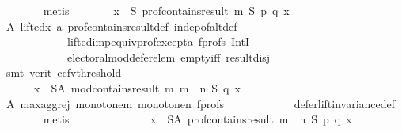 \begin{isabellebody}
\ \ \ \ \ \ \isamarkupfalse%
\ metis\isanewline
\ \ \ \ \isamarkupfalse%
\ \isamarkupfalse%
\ {\isachardoublequoteopen}{\isasymforall}x\ {\isasymin}\ S{\isachardot}{\kern0pt}\ prof{\isacharunderscore}{\kern0pt}contains{\isacharunderscore}{\kern0pt}result\ m\ S\ p\ q\ x{\isachardoublequoteclose}\isanewline
\ \ \ \ \ \ \isamarkupfalse%
\ A\ lifted{\isacharunderscore}{\kern0pt}x\ a{}\ prof{\isacharunderscore}{\kern0pt}contains{\isacharunderscore}{\kern0pt}result{\isacharunderscore}{\kern0pt}def\ indep{\isacharunderscore}{\kern0pt}of{\isacharunderscore}{\kern0pt}alt{\isacharunderscore}{\kern0pt}def\isanewline
\ \ \ \ \ \ \ \ \ \ \ \ lifted{\isacharunderscore}{\kern0pt}imp{\isacharunderscore}{\kern0pt}equiv{\isacharunderscore}{\kern0pt}prof{\isacharunderscore}{\kern0pt}except{\isacharunderscore}{\kern0pt}a\ f{\isacharunderscore}{\kern0pt}profs\ IntI\isanewline
\ \ \ \ \ \ \ \ \ \ \ \ electoral{\isacharunderscore}{\kern0pt}mod{\isacharunderscore}{\kern0pt}defer{\isacharunderscore}{\kern0pt}elem\ empty{\isacharunderscore}{\kern0pt}iff\ result{\isacharunderscore}{\kern0pt}disj\isanewline
\ \ \ \ \ \ \isamarkupfalse%
\ {\isacharparenleft}{\kern0pt}smt\ {\isacharparenleft}{\kern0pt}verit{\isacharcomma}{\kern0pt}\ ccfv{\isacharunderscore}{\kern0pt}threshold{\isacharparenright}{\kern0pt}{\isacharparenright}{\kern0pt}\isanewline
\ \ \ \ \isamarkupfalse%
\ \isamarkupfalse%
\isanewline
\ \ \ \ \ \ {\isachardoublequoteopen}{\isasymforall}x\ {\isasymin}\ S{\isacharminus}{\kern0pt}A{\isachardot}{\kern0pt}\ mod{\isacharunderscore}{\kern0pt}contains{\isacharunderscore}{\kern0pt}result\ m\ {\isacharparenleft}{\kern0pt}m\ {\isasymparallel}\isactrlsub {\isasymup}\ n{\isacharparenright}{\kern0pt}\ S\ q\ x{\isachardoublequoteclose}\isanewline
\ \ \ \ \ \ \isamarkupfalse%
\ A\ max{\isacharunderscore}{\kern0pt}agg{\isacharunderscore}{\kern0pt}rej{}\ monotone{\isacharunderscore}{\kern0pt}m\ monotone{\isacharunderscore}{\kern0pt}n\ f{\isacharunderscore}{\kern0pt}profs\isanewline
\ \ \ \ \ \ \ \ \ \ \ \ defer{\isacharunderscore}{\kern0pt}lift{\isacharunderscore}{\kern0pt}invariance{\isacharunderscore}{\kern0pt}def\isanewline
\ \ \ \ \ \ \isamarkupfalse%
\ metis\isanewline
\ \ \ \ \isamarkupfalse%
\ \isamarkupfalse%
\ {}{}{\isacharcolon}{\kern0pt}\isanewline
\ \ \ \ \ \ {\isachardoublequoteopen}{\isasymforall}x\ {\isasymin}\ S{\isacharminus}{\kern0pt}A{\isachardot}{\kern0pt}\ prof{\isacharunderscore}{\kern0pt}contains{\isacharunderscore}{\kern0pt}result\ {\isacharparenleft}{\kern0pt}m\ {\isasymparallel}\isactrlsub {\isasymup}\ n{\isacharparenright}{\kern0pt}\ S\ p\ q\ x{\isachardoublequoteclose}\isanewline

\end{isabellebody}
